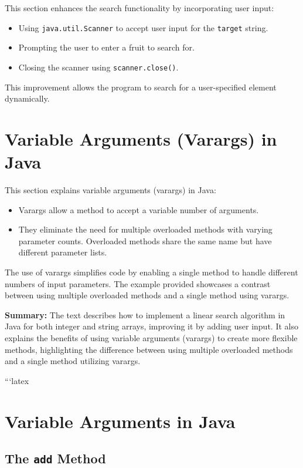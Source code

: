 \documentclass{article}
\begin{document}
This section enhances the search functionality by incorporating user input:

\begin{itemize}
\item  Using \texttt{java.util.Scanner} to accept user input for the \texttt{target} string.
\item Prompting the user to enter a fruit to search for.
\item Closing the scanner using \texttt{scanner.close()}.
\end{itemize}

This improvement allows the program to search for a user-specified element dynamically.


\section{Variable Arguments (Varargs) in Java}

This section explains variable arguments (varargs) in Java:

\begin{itemize}
    \item Varargs allow a method to accept a variable number of arguments.
    \item They eliminate the need for multiple overloaded methods with varying parameter counts.  Overloaded methods share the same name but have different parameter lists.
\end{itemize}

The use of varargs simplifies code by enabling a single method to handle different numbers of input parameters.  The example provided showcases a contrast between using multiple overloaded methods and a single method using varargs.

\textbf{Summary:} The text describes how to implement a linear search algorithm in Java for both integer and string arrays, improving it by adding user input.  It also explains the benefits of using variable arguments (varargs) to create more flexible methods, highlighting the difference between using multiple overloaded methods and a single method utilizing varargs.


```latex
\section{Variable Arguments in Java}

\subsection{The \texttt{add} Method}
\end{document}
